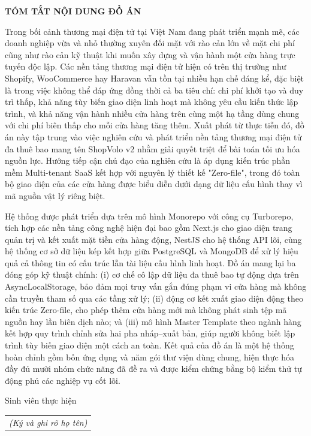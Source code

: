 \documentclass[../main.tex]{subfiles}
\begin{document}
\begin{center}
    \Large{\textbf{TÓM TẮT NỘI DUNG ĐỒ ÁN}}\\
\end{center}
\vspace{1cm}
Trong bối cảnh thương mại điện tử tại Việt Nam đang phát triển mạnh mẽ, các doanh nghiệp vừa và nhỏ thường xuyên đối mặt với rào cản lớn về mặt chi phí cũng như rào cản kỹ thuật khi muốn xây dựng và vận hành một cửa hàng trực tuyến độc lập. Các nền tảng thương mại điện tử hiện có trên thị trường như Shopify, WooCommerce hay Haravan vẫn tồn tại nhiều hạn chế đáng kể, đặc biệt là trong việc không thể đáp ứng đồng thời cả ba tiêu chí: chi phí khởi tạo và duy trì thấp, khả năng tùy biến giao diện linh hoạt mà không yêu cầu kiến thức lập trình, và khả năng vận hành nhiều cửa hàng trên cùng một hạ tầng dùng chung với chi phí biên thấp cho mỗi cửa hàng tăng thêm. Xuất phát từ thực tiễn đó, đồ án này tập trung vào việc nghiên cứu và phát triển nền tảng thương mại điện tử đa thuê bao mang tên ShopVolo v2 nhằm giải quyết triệt để bài toán tối ưu hóa nguồn lực. Hướng tiếp cận chủ đạo của nghiên cứu là áp dụng kiến trúc phần mềm Multi-tenant SaaS kết hợp với nguyên lý thiết kế "Zero-file", trong đó toàn bộ giao diện của các cửa hàng được biểu diễn dưới dạng dữ liệu cấu hình thay vì mã nguồn vật lý riêng biệt.

Hệ thống được phát triển dựa trên mô hình Monorepo với công cụ Turborepo, tích hợp các nền tảng công nghệ hiện đại bao gồm Next.js cho giao diện trang quản trị và kết xuất mặt tiền cửa hàng động, NestJS cho hệ thống API lõi, cùng hệ thống cơ sở dữ liệu kép kết hợp giữa PostgreSQL và MongoDB để xử lý hiệu quả cả thông tin có cấu trúc lẫn tài liệu cấu hình linh hoạt. Đồ án mang lại ba đóng góp kỹ thuật chính: (i) cơ chế cô lập dữ liệu đa thuê bao tự động dựa trên AsyncLocalStorage, bảo đảm mọi truy vấn gắn đúng phạm vi cửa hàng mà không cần truyền tham số qua các tầng xử lý; (ii) động cơ kết xuất giao diện động theo kiến trúc Zero-file, cho phép thêm cửa hàng mới mà không phát sinh tệp mã nguồn hay lần biên dịch nào; và (iii) mô hình Master Template theo ngành hàng kết hợp quy trình chỉnh sửa hai pha nháp--xuất bản, giúp người không biết lập trình tùy biến giao diện một cách an toàn. Kết quả của đồ án là một hệ thống hoàn chỉnh gồm bốn ứng dụng và năm gói thư viện dùng chung, hiện thực hóa đầy đủ mười nhóm chức năng đã đề ra và được kiểm chứng bằng bộ kiểm thử tự động phủ các nghiệp vụ cốt lõi.
\begin{flushright}
Sinh viên thực hiện\\
\begin{tabular}{@{}c@{}}
\textit{(Ký và ghi rõ họ tên)}
\end{tabular}
\end{flushright}
\end{document}
